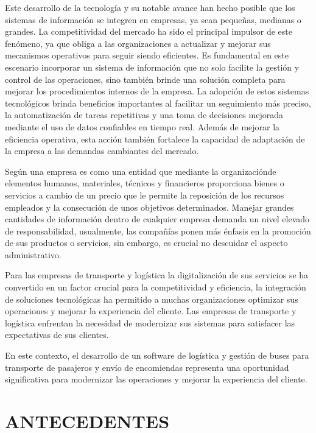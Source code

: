 \documentclass[12pt,letterpaper]{article}
\begin{document}
Este desarrollo de la tecnología y su notable avance han hecho posible que los sistemas de información se integren en empresas, ya sean pequeñas, medianas o grandes. La competitividad del mercado ha sido el principal impulsor de este fenómeno, ya que obliga a las organizaciones a actualizar y mejorar sus mecanismos operativos para seguir siendo eficientes. Es fundamental en este escenario incorporar un sistema de información que no solo facilite la gestión y control de las operaciones, sino también brinde una solución completa para mejorar los procedimientos internos de la empresa. La adopción de estos sistemas tecnológicos brinda beneficios importantes al facilitar un seguimiento más preciso, la automatización de tareas repetitivas y una toma de decisiones mejorada mediante el uso de datos confiables en tiempo real. Además de mejorar la eficiencia operativa, esta acción también fortalece la capacidad de adaptación de la empresa a las demandas cambiantes del mercado.

Según \textcite{casanueva2000practicas} una empresa es como una entidad que mediante la organizaciónde elementos humanos, materiales, técnicos y financieros proporciona bienes o servicios a cambio de un precio que le permite la reposición de los recursos empleados y la consecución de unos objetivos determinados. Manejar grandes cantidades de información dentro de cualquier empresa demanda un nivel elevado de responsabilidad, usualmente, las compañías ponen más énfasis en la promoción de sus productos o servicios, sin embargo, es crucial no descuidar el aspecto administrativo.

Para las empresas de transporte y logística la digitalización de sus servicios se ha convertido en un factor crucial para la competitividad y eficiencia, la integración de soluciones tecnológicas ha permitido a muchas organizaciones optimizar sus operaciones y mejorar la experiencia del cliente. Las empresas de transporte y logística enfrentan la necesidad de modernizar sus sistemas para satisfacer las expectativas de sus clientes. 

En este contexto, el desarrollo de un software de logística y gestión de buses para transporte de pasajeros y envío de encomiendas representa una oportunidad significativa para modernizar las operaciones y mejorar la experiencia del cliente.

\section{ANTECEDENTES}
\end{document}
